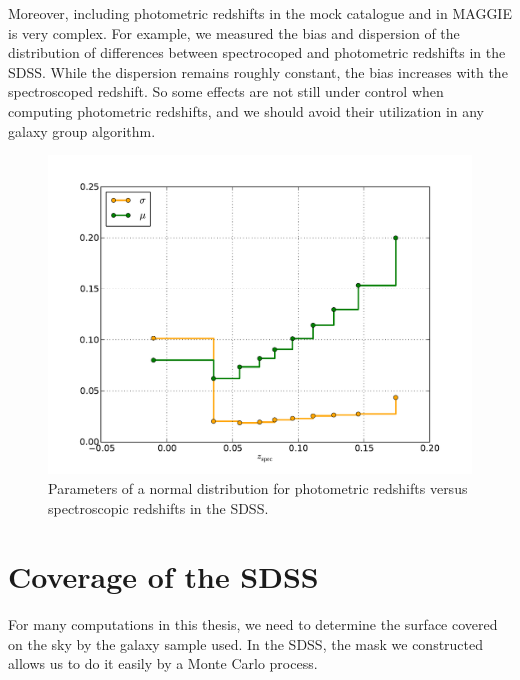 Moreover, including photometric redshifts in the mock catalogue and in
MAGGIE is very complex. For example, we measured the bias and dispersion of
the distribution of differences between spectrocoped and photometric
redshifts in the SDSS\@. While the dispersion remains roughly constant, the
bias increases with the spectroscoped redshift. So some effects are not
still under control when computing photometric redshifts, and we should
avoid their utilization in any galaxy group algorithm.
%
\begin{figure}[htb]
    \centering
    \includegraphics[width=0.8\linewidth]{figures/sdss/redshift_difference.pdf}
    \caption{Parameters of a normal distribution for photometric redshifts
    versus spectroscopic redshifts in the SDSS\@.}
\label{fig:redshift_difference}
\end{figure}
%
%
\section{Coverage of the SDSS}
%
For many computations in this thesis, we need to determine the surface covered
on the sky by the galaxy sample used. In the SDSS, the mask we constructed
allows us to do it easily by a Monte Carlo process.

